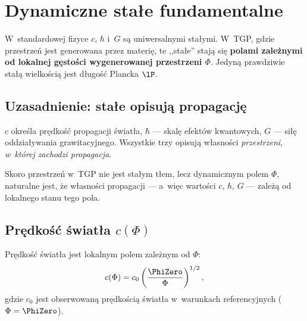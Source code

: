 \section{Dynamiczne sta\l{}e fundamentalne}\label{sec:stale}

W~standardowej fizyce $c$, $\hbar$ i~$G$ s\k{a} uniwersalnymi sta\l{}ymi.
W~TGP, gdzie przestrze\'n jest generowana przez materi\k{e}, te
,,sta\l{}e'' staj\k{a} si\k{e} \textbf{polami zale\.znymi od lokalnej
g\k{e}sto\'sci wygenerowanej przestrzeni $\Phi$}. Jedyn\k{a} prawdziwie
sta\l{}\k{a} wielko\'sci\k{a} jest d\l{}ugo\'s\'c Plancka $\lP$.

\subsection{Uzasadnienie: sta\l{}e opisuj\k{a} propagacj\k{e}}\label{ssec:uzasadnienie}

$c$ okre\'sla pr\k{e}dko\'s\'c propagacji \'swiat\l{}a,
$\hbar$ --- skal\k{e} efekt\'ow kwantowych,
$G$ --- si\l{}\k{e} oddzia\l{}ywania grawitacyjnego.
Wszystkie trzy opisuj\k{a} w\l{}asno\'sci
\emph{przestrzeni, w~kt\'orej zachodzi propagacja}.

Skoro przestrze\'n w~TGP nie jest sta\l{}ym t\l{}em, lecz dynamicznym
polem $\Phi$, naturalne jest, \.ze w\l{}asno\'sci propagacji
--- a~wi\k{e}c warto\'sci $c$, $\hbar$, $G$ --- zale\.z\k{a} od
lokalnego stanu tego pola.

\subsection{Pr\k{e}dko\'s\'c \'swiat\l{}a $c(\Phi)$}\label{ssec:c}

\begin{axiom}\label{ax:c}
Pr\k{e}dko\'s\'c \'swiat\l{}a jest lokalnym polem zale\.znym od $\Phi$:
\begin{equation}\label{eq:cPhi}
    c(\Phi) = c_0 \left(\frac{\PhiZero}{\Phi}\right)^{1/2},
\end{equation}
gdzie $c_0$ jest obserwowaną pr\k{e}dko\'sci\k{a} \'swiat\l{}a w~warunkach
referencyjnych ($\Phi = \PhiZero$).
\end{axiom}

